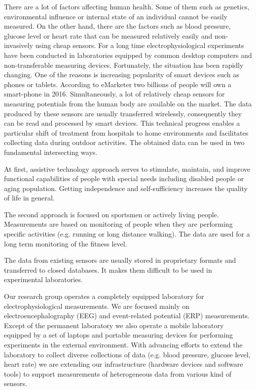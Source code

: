 \documentclass[a4paper,twoside]{article}
\begin{document}
\noindent
There are a lot of factors affecting human health. Some of them such as genetics, environmental influence or internal state of an individual cannot be easily measured. On the other hand, there are the factors such as blood pressure, glucose level or heart rate that can be measured relatively easily and non-invasively using cheap sensors. For a long time electrophysiological experiments have been conducted in laboratories equipped by common desktop computers and non-transferable measuring devices. Fortunately, the situation has been rapidly changing. One of the reasons is increasing popularity of smart devices such as phones or tablets. According to eMarketer \cite{emark} two billions of people will own a smart-phone in 2016. Simultaneously, a lot of relatively cheap sensors for measuring potentials from the human body are available on the market. The data produced by these sensors are usually transferred wirelessly, consequently they can be read and processed by smart devices. This technical progress enables a particular shift of treatment from hospitals to home environments and facilitates collecting data during outdoor activities. The obtained data can be used in two fundamental intersecting ways.

At first, assistive technology approach serves to stimulate, maintain, and improve functional capabilities of people with special needs including disabled people or aging population. Getting independence and self-sufficiency increases the quality of life in general.

The second approach is focused on sportsmen or actively living people. Measurements are based on monitoring of people when they are performing specific activities (e.g. running or long distance walking). The data are used for a long term monitoring of the fitness level.

The data from existing sensors are usually stored in proprietary formats and transferred to closed databases. It makes them difficult to be used in experimental laboratories.

Our research group operates a completely equipped laboratory \cite{10.3389/fninf.2014.00020} for electrophysiological measurements. We are focused mainly on electroencephalography (EEG) and event-related potential (ERP) measurements. Except of the permanent laboratory we also operate a mobile laboratory equipped by a set of laptops and portable measuring devices for performing experiments in the external environment. With advancing efforts to extend the laboratory to collect diverse collections of data (e.g. blood pressure, glucose level, heart rate) we are extending our infrastructure (hardware devices and software tools) to support  measurements of heterogeneous data from various kind of sensors.
\end{document}
